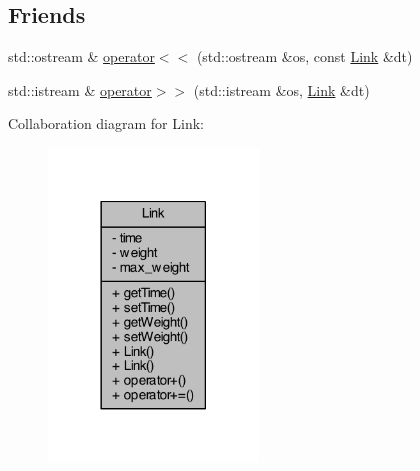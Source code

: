 \subsection*{Friends}
\begin{DoxyCompactItemize}
\item 
std\+::ostream \& \hyperlink{class_link_a7bf934f67abd8e74c78d5fbfadc427db}{operator$<$$<$} (std\+::ostream \&os, const \hyperlink{class_link}{Link} \&dt)
\item 
std\+::istream \& \hyperlink{class_link_a6a5bf13913ca69fd9b3b8fde3e7cc953}{operator$>$$>$} (std\+::istream \&os, \hyperlink{class_link}{Link} \&dt)
\end{DoxyCompactItemize}


Collaboration diagram for Link\+:\nopagebreak
\begin{figure}[H]
\begin{center}
\leavevmode
\includegraphics[width=158pt]{class_link__coll__graph}
\end{center}
\end{figure}


